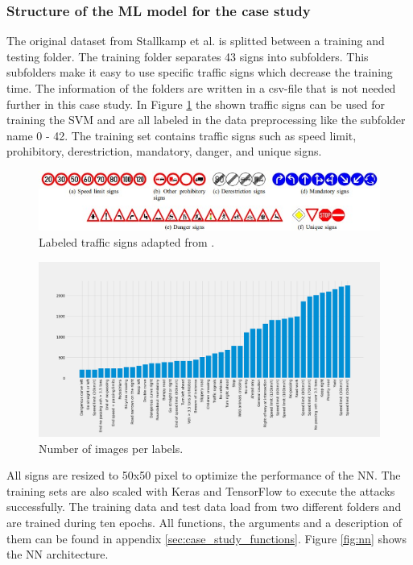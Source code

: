 \subsubsection*{Structure of the ML model for the case study}

The original dataset from Stallkamp et al. \cite{DBLP:conf/ijcnn/StallkampSSI11} is splitted between a training and testing folder. The training folder separates 43 signs into subfolders. This subfolders make it easy to use specific traffic signs which decrease the training time. The information of the folders are written in a csv-file that is not needed further in this case study. In Figure \ref{fig:traffic_signs} the shown traffic signs can be used for training the SVM and are all labeled in the data preprocessing like the subfolder name 0 - 42. The training set contains traffic signs such as speed limit, prohibitory, derestriction, mandatory, danger, and unique signs.

\begin{figure}[h!]
  \centering
  \includegraphics[width=12cm]{pictures/traffic_signs.jpg}
  \caption{Labeled traffic signs adapted from \cite{DBLP:conf/ijcnn/StallkampSSI11}.}
  \label{fig:traffic_signs}
\end{figure}

\begin{figure}[h!]
  \centering
  \includegraphics[width=15cm]{pictures/num_of_images.png}
  \caption{Number of images per labels.}
  \label{fig:num_of_images}
\end{figure}

All signs are resized to 50x50 pixel to optimize the performance of the NN. The training sets are also scaled with Keras and TensorFlow to execute the attacks successfully. The training data and test data load from two different folders and are trained during ten epochs. All functions, the arguments and a description of them can be found in appendix \ref{sec:case_study_functions}. Figure \ref{fig:nn} shows the NN architecture.

